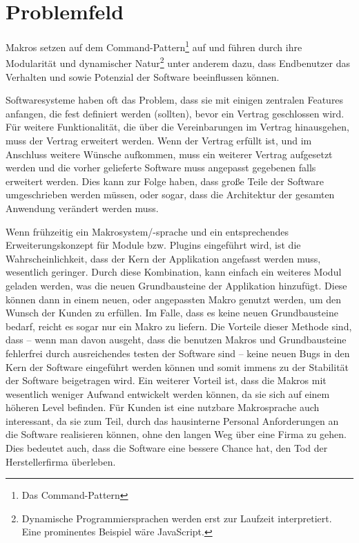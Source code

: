 \section{Problemfeld}
\label{sec:problemfeld}
  Makros setzen auf dem Command-Pattern\footnote{
    Das Command-Pattern
  } auf und führen durch ihre Modularität und dynamischer Natur\footnote{
    Dynamische Programmiersprachen werden erst zur Laufzeit interpretiert. Eine prominentes Beispiel wäre JavaScript.
  } unter anderem dazu, dass Endbenutzer das Verhalten und sowie Potenzial der Software beeinflussen können.

  Softwaresysteme haben oft das Problem, dass sie mit einigen zentralen Features anfangen, die fest definiert werden (sollten), bevor ein Vertrag geschlossen wird. Für weitere Funktionalität, die über die Vereinbarungen im Vertrag hinausgehen, muss der Vertrag erweitert werden. Wenn der Vertrag erfüllt ist, und im Anschluss weitere Wünsche aufkommen, muss ein weiterer Vertrag aufgesetzt werden und die vorher gelieferte Software muss angepasst gegebenen falls erweitert werden. Dies kann zur Folge haben, dass große Teile der Software umgeschrieben werden müssen, oder sogar, dass die Architektur der gesamten Anwendung verändert werden muss.

  Wenn frühzeitig ein Makrosystem/-sprache und ein entsprechendes Erweiterungskonzept für Module bzw. Plugins eingeführt wird, ist die Wahrscheinlichkeit, dass der Kern der Applikation angefasst werden muss, wesentlich geringer. Durch diese Kombination, kann einfach ein weiteres Modul geladen werden, was die neuen Grundbausteine der Applikation hinzufügt. Diese können dann in einem neuen, oder angepassten Makro genutzt werden, um den Wunsch der Kunden zu erfüllen. Im Falle, dass es keine neuen Grundbausteine bedarf, reicht es sogar nur ein Makro zu liefern. Die Vorteile dieser Methode sind, dass -- wenn man davon ausgeht, dass die benutzen Makros und Grundbausteine fehlerfrei durch ausreichendes testen der Software sind -- keine neuen Bugs in den Kern der Software eingeführt werden können und somit immens zu der Stabilität der Software beigetragen wird. Ein weiterer Vorteil ist, dass die Makros mit wesentlich weniger Aufwand entwickelt werden können, da sie sich auf einem höheren Level befinden. Für Kunden ist eine nutzbare Makrosprache auch interessant, da sie zum Teil, durch das hausinterne Personal Anforderungen an die Software realisieren können, ohne den langen Weg über eine Firma zu gehen. Dies bedeutet auch, dass die Software eine bessere Chance hat, den Tod der Herstellerfirma überleben.


